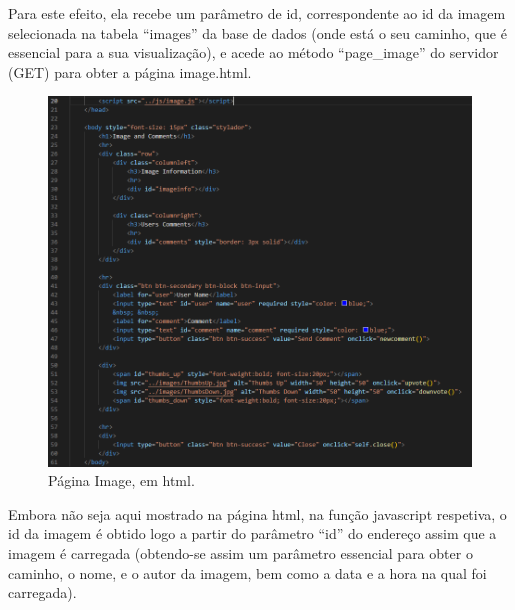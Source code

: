 \documentclass{report}
\begin{document}
 \linebreak
 \bigskip
 
 Para este efeito, ela recebe um parâmetro de id, correspondente ao id da imagem selecionada na tabela “images” da base de dados (onde está o seu caminho, que é essencial para a sua visualização), e acede ao método “page\_image” do servidor (GET) para obter a página image.html.

 \newpage

\begin{figure}[!hbtp]
        \centering
        \includegraphics[scale=0.60]{Images_code/11 - html image.png}
        \caption{\label{Estrutura}Página Image, em html.}
\end{figure}


 Embora não seja aqui mostrado na página html, na função javascript respetiva, o id da imagem é obtido logo a partir do parâmetro “id” do endereço assim que a imagem é carregada (obtendo-se assim um parâmetro essencial para obter o caminho, o nome, e o autor da imagem, bem como a data e a hora na qual foi carregada).
 
	

 \newpage
\end{document}
